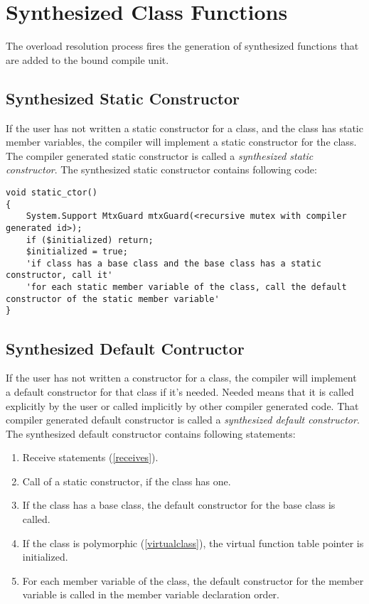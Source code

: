 \documentclass[a4paper,oneside,11pt]{book}
\theoremstyle{definition}
\begin{document}
\section{Synthesized Class Functions}

The overload resolution process fires the generation of synthesized functions that are added to the bound compile unit.

\subsection{Synthesized Static Constructor}

If the user has not written a static constructor for a class, and the class has static member variables, the compiler will implement a
static constructor for the class.
The compiler generated static constructor is called a \emph{synthesized static constructor}.
The synthesized static constructor contains following code:
\lstset{language=Cmajor}
\begin{lstlisting}[frame=trBL]
void static_ctor()
{
    System.Support MtxGuard mtxGuard(<recursive mutex with compiler generated id>);
    if ($initialized) return;
    $initialized = true;
    'if class has a base class and the base class has a static constructor, call it'
    'for each static member variable of the class, call the default constructor of the static member variable'
}
\end{lstlisting}

\subsection{Synthesized Default Contructor}

If the user has not written a constructor for a class, the compiler will implement a default constructor for that class if it's needed.
Needed means that it is called explicitly by the user or called implicitly by other compiler generated code.
That compiler generated default constructor is called a \emph{synthesized default constructor}.
The synthesized default constructor contains following statements:
\begin{enumerate}
\item
Receive statements (\ref{receives}).
\item
Call of a static constructor, if the class has one.
\item
If the class has a base class, the default constructor for the base class is called.
\item
If the class is polymorphic (\ref{virtualclass}), the virtual function table pointer is initialized.
\item
For each member variable of the class, the default constructor for the member variable is called in the member variable declaration order.
\end{enumerate}
\end{document}
